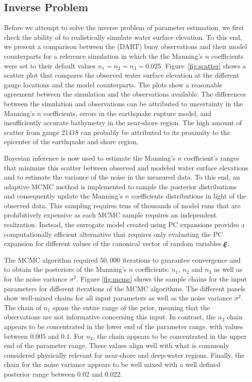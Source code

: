 \subsection{Inverse Problem} 
\label{sec:inverse}

Before we attempt to solve the inverse problem of parameter estimation, 
we first check the ability of \geoclaw to realistically simulate water 
surface elevation. To this end, we present a comparison between the 
(DART) buoy observations and their \geoclaw model counterparts
for a reference simulation in which the the Manning's $n$ coefficients were set to their default values $n_1=n_2=n_3=0.025$. Figure~\ref{fig:scatter} 
shows a scatter plot that compares the observed 
water surface elevation at the different gauge locations and the \geoclaw model counterparts. The plots show a reasonable agreement between the simulation and the observations available.  The differences between the simulation and observations can be attributed to uncertainty in the Manning's $n$ coefficients, errors in the earthquake rupture model, and insufficiently accurate bathymetry in the near-shore region.  The high amount of scatter from gauge 21418 can probably be attributed to its proximity to the epicenter of the earthquake and shore region.

Bayesian inference is now used to estimate the Manning's 
$n$ coefficient's ranges that minimize this scatter between 
observed and modeled water surface elevations and to estimate the variance of the noise in the measured data.
To this end, an adaptive MCMC method is implemented to sample 
the posterior distributions \citep{Gareth2009,Haario2001} and consequently 
update the Manning's $n$ coefficients distributions in light of the 
observed data. This sampling requires tens of thousands of 
\geoclaw model runs that are prohibitively expensive as each MCMC 
sample requires an independent \geoclaw realization. Instead,
the surrogate model created using PC expansions provides a computationally
efficient alternative that requires only evaluating the PC expansion
for different values of the canonical vector of random variables $\xxi$.

The MCMC algorithm required $50,000$ iterations to guarantee convergence and to
obtain the posteriors of the Manning's $n$ coefficients:  $n_1$, $n_2$ and $n_3$
as well as for the noise variance $\sigma^2$. Figure \ref{fig:mcmc}  shows the sample
chains for the input parameters for different iterations of the MCMC algorithms.
The different panels show well-mixed chains for all input parameters as well as
the noise variance $\sigma^2$. The chain of  $n_{1}$ spans the entire range of the
prior, meaning that the observations are not informative  concerning this input.
In contrast, the $n_{2}$ chain appears to be concentrated in the  lower end of
the parameter range, with values between 0.005 and 0.1. For $n_{3}$, the chain
appears to be concentrated in the  upper end of the parameter range. These values align well with what is
commonly considered physically relevant for near-shore and deep-water regions.
Finally, the chain for the noise variance  appears to be well mixed with a well defined
posterior range between 0.02 and 0.022.  


